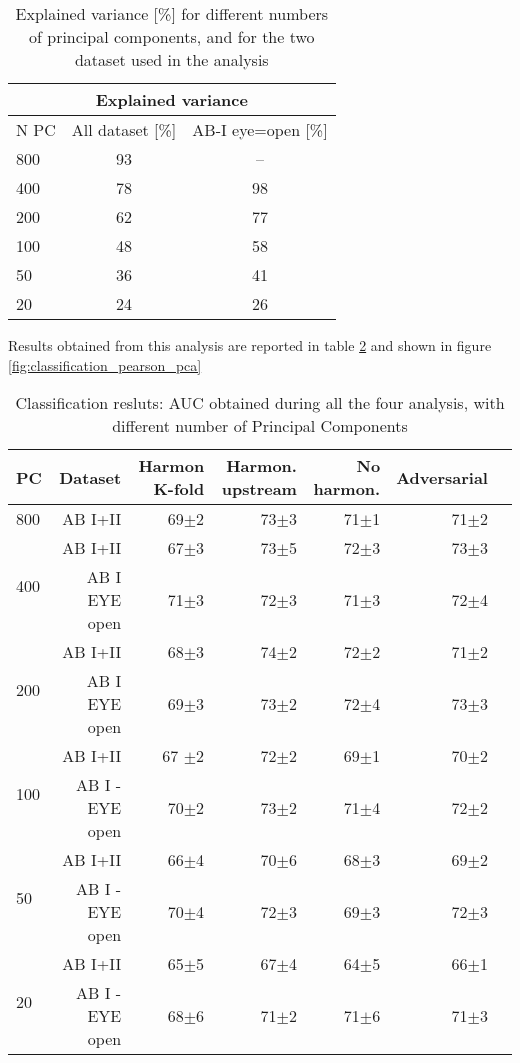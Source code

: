 \documentclass[12pt]{report}
\begin{document}
\begin{table}
\centering
\begin{tabular}{ |l|c c| }
\hline
\multicolumn{3}{|c|}{Explained variance} \\
 \hline
  N PC & All dataset [\%] & AB-I eye=open [\%] \\
  \hline
 800 & 93 & -- \\
 400 & 78 & 98 \\
 200 & 62 & 77 \\
 100 &48 & 58 \\
 50 & 36 & 41 \\
 20 & 24 & 26\\
 \hline
\end{tabular}
\caption{Explained variance [\%] for different numbers of principal components, and for the two dataset used in the analysis}
\label{tab:pca_explained}
\end{table}



Results obtained from this analysis are reported in table \ref{tab:classification_pearson_pca} and shown in figure \ref{fig:classification_pearson_pca}

\begin{table}[!htp]\centering
\scriptsize
\begin{tabular}{lrrrrrr}\toprule
PC &Dataset &Harmon K-fold &Harmon. upstream &No harmon. &Adversarial \\\midrule
800 &AB I+II &69$\pm$2 &73$\pm$3 &71$\pm$1 &71$\pm$2 \\
\hline
\multirow{2}{*}{400} &AB I+II &67$\pm$3 &73$\pm$5 &72$\pm$3 &73$\pm$3 \\
&AB I EYE open &71$\pm$3 &72$\pm$3 &71$\pm$3 &72$\pm$4 \\
\hline
\multirow{2}{*}{200} &AB I+II &68$\pm$3 &74$\pm$2 &72$\pm$2 &71$\pm$2 \\
&AB I EYE open &69$\pm$3 &73$\pm$2 &72$\pm$4 &73$\pm$3 \\
\hline
\multirow{2}{*}{100} &AB I+II &67 $\pm$2 &72$\pm$2 &69$\pm$1 &70$\pm$2 \\
&AB I - EYE open &70$\pm$2 &73$\pm$2 &71$\pm$4 &72$\pm$2 \\
\hline
\multirow{2}{*}{50} &AB I+II &66$\pm$4 &70$\pm$6 &68$\pm$3 &69$\pm$2 \\
&AB I - EYE open &70$\pm$4 &72$\pm$3 &69$\pm$3 &72$\pm$3 \\
\hline
\multirow{2}{*}{20} &AB I+II &65$\pm$5 &67$\pm$4 &64$\pm$5 &66$\pm$1 \\
&AB I - EYE open &68$\pm$6 &71$\pm$2 &71$\pm$6 &71$\pm$3 \\
\bottomrule
\end{tabular}
\caption{Classification resluts: AUC obtained during all the four analysis, with different number of Principal Components}
\label{tab:classification_pearson_pca}
\end{table}
\end{document}
